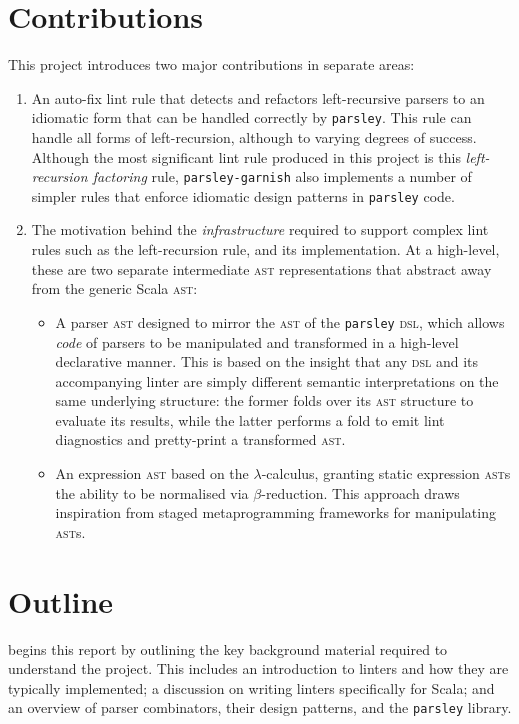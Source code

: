 \documentclass[../../main.tex]{subfiles}
\begin{document}
\section*{Contributions}
This project introduces two major contributions in separate areas:
\begin{enumerate}
  \item An auto-fix lint rule that detects and refactors left-recursive parsers to an idiomatic form that can be handled correctly by \texttt{parsley}. This rule can handle all forms of left-recursion, although to varying degrees of success. Although the most significant lint rule produced in this project is this \emph{left-recursion factoring} rule, \texttt{parsley-garnish} also implements a number of simpler rules that enforce idiomatic design patterns in \texttt{parsley} code.
  \item The motivation behind the \emph{infrastructure} required to support complex lint rules such as the left-recursion rule, and its implementation. At a high-level, these are two separate intermediate \textsc{ast} representations that abstract away from the generic Scala \textsc{ast}:
  \begin{itemize}
    \item A parser \textsc{ast} designed to mirror the \textsc{ast} of the \texttt{parsley} \textsc{dsl}, which allows \emph{code} of parsers to be manipulated and transformed in a high-level declarative manner. This is based on the insight that any \textsc{dsl} and its accompanying linter are simply different semantic interpretations on the same underlying structure: the former folds over its \textsc{ast} structure to evaluate its results, while the latter performs a fold to emit lint diagnostics and pretty-print a transformed \textsc{ast}.
    \item An expression \textsc{ast} based on the $\lambda$-calculus, granting static expression \textsc{ast}s the ability to be normalised via $\beta$-reduction. This approach draws inspiration from staged metaprogramming frameworks for manipulating \textsc{ast}s.
  \end{itemize}
\end{enumerate}

\section*{Outline}
 begins this report by outlining the key background material required to understand the project.
This includes an introduction to linters and how they are typically implemented; a discussion on writing linters specifically for Scala; and an overview of parser combinators, their design patterns, and the \texttt{parsley} library.
\end{document}

